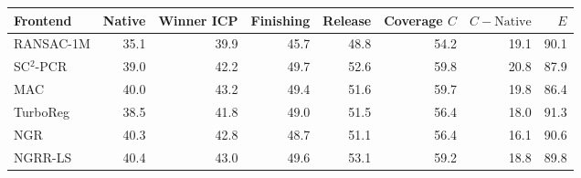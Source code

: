 \small
\begin{tabular}{lrrrrrrr}
\toprule
Frontend & Native & Winner ICP & Finishing & Release & Coverage $C$ & $C-\mathrm{Native}$ & $E$ \\
\midrule
RANSAC-1M & 35.1 & 39.9 & 45.7 & 48.8 & 54.2 & 19.1 & 90.1 \\
SC$^2$-PCR & 39.0 & 42.2 & 49.7 & 52.6 & 59.8 & 20.8 & 87.9 \\
MAC & 40.0 & 43.2 & 49.4 & 51.6 & 59.7 & 19.8 & 86.4 \\
TurboReg & 38.5 & 41.8 & 49.0 & 51.5 & 56.4 & 18.0 & 91.3 \\
NGR & 40.3 & 42.8 & 48.7 & 51.1 & 56.4 & 16.1 & 90.6 \\
NGRR-LS & 40.4 & 43.0 & 49.6 & 53.1 & 59.2 & 18.8 & 89.8 \\
\bottomrule
\end{tabular}
